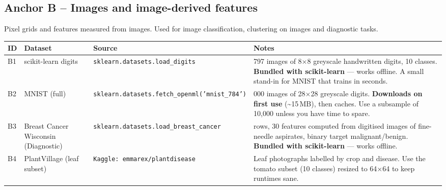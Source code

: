 \documentclass[11pt,a4paper]{article}
\begin{document}
\subsection*{Anchor B -- Images and image-derived features}
Pixel grids and features measured from images. Used for image classification, clustering on images and diagnostic tasks.\\[0.3em]
\begin{center}\footnotesize\begin{tabular}{@{}p{0.7cm}>{\raggedright\arraybackslash}p{3.1cm}>{\raggedright\arraybackslash}p{4.1cm}>{\raggedright\arraybackslash}p{6.4cm}@{}}\toprule\textbf{ID} & \textbf{Dataset} & \textbf{Source} & \textbf{Notes}\\
\midrule
B1 & scikit-learn digits & \texttt{\footnotesize sklearn.datasets.load\_digits} & 1{,}797 images of 8$\times$8 greyscale handwritten digits, 10 classes. \textbf{Bundled with scikit-learn} --- works offline. A small stand-in for MNIST that trains in seconds.\\
B2 & MNIST (full) & \texttt{\footnotesize sklearn.datasets.fetch\_openml('mnist\_784')} & 70{,}000 images of 28$\times$28 greyscale digits. \textbf{Downloads on first use} (\textasciitilde15\,MB), then caches. Use a subsample of 10{,}000 unless you have time to spare.\\
B3 & Breast Cancer Wisconsin (Diagnostic) & \texttt{\footnotesize sklearn.datasets.load\_breast\_cancer} & 569 rows, 30 features computed from digitised images of fine-needle aspirates, binary target malignant/benign. \textbf{Bundled with scikit-learn} --- works offline.\\
B4 & PlantVillage (leaf subset) & \texttt{\footnotesize Kaggle: emmarex/plantdisease} & Leaf photographs labelled by crop and disease. Use the tomato subset (10 classes) resized to 64$\times$64 to keep runtimes sane.\\
\bottomrule\end{tabular}\end{center}
\end{document}
